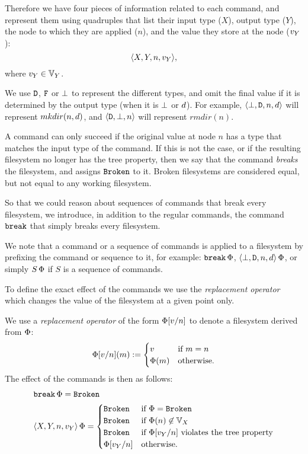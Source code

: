 \begin{mydef}
Therefore we have four pieces of information related to each command,
and represent them using quadruples that list
their input type ($X$), output type ($Y$),
the node to which they are applied ($n$),
and the value they store at the node ($v_Y$):
\[ \langle{X,Y,n,v_Y}\rangle, \]
where $v_Y\in\mathbb{V}_{Y}$.

We use $\mathtt{D}$, $\mathtt{F}$ or $\bot$ to represent the different
types, and omit the final value if it is determined by the output type
(when it is $\bot$ or $d$).
For example, $\langle{\bot,\mathtt{D},n,d}\rangle$ will represent $mkdir(n,d)$,
and $\langle{\mathtt{D},\bot,n}\rangle$ will represent $rmdir(n)$.
\end{mydef}

\bigskip

\noindent
A command can only succeed if the original value at node $n$ has a type that matches
the input type of the command. If this is not the case, or if the resulting
filesystem no longer has the tree property, then we say that the command
{\em breaks} the filesystem, and assigns $\mathtt{Broken}$ to it.
Broken filesystems are considered equal, but not equal to any working filesystem.

So that we could reason about sequences of commands that break every filesystem, 
we introduce, in addition to the regular commands,
the command $\mathtt{break}$ that simply breaks every filesystem.

We note that a command or a sequence of commands is applied to a filesystem
by prefixing the command or sequence to it, for example: $\mathtt{break}\,\Phi$, $\langle{\bot,\mathtt{D},n,d}\rangle\,\Phi$, 
or simply $S\,\Phi$ if $S$ is a sequence of commands.

To define the exact effect of the commands we use
the \emph{replacement operator}  which changes the
value of the filesystem at a given point only.

\begin{mydef}
We use a \emph{replacement operator} of the form
$\Phi[v/n]$ to denote a filesystem derived from $\Phi$:
\[ \Phi[v/n](m) :=
   \begin{cases}
   v &\mbox{if~} m=n\\
   \Phi(m) &\mbox{otherwise.}
   \end{cases}
\]
The effect of the commands is then as follows:
\begin{align*}
&\mathtt{break}\,\Phi = \mathtt{Broken} \\
&\langle{X,Y,n,v_Y}\rangle\,\Phi = 
   \begin{cases}
   \mathtt{Broken} &\mbox{if~} \Phi=\mathtt{Broken}\\
   \mathtt{Broken} &\mbox{if~} \Phi(n)\not\in\mathbb{V}_{X}\\
   \mathtt{Broken} &\mbox{if~} \Phi[v_Y/n] \mbox{~violates the tree property}\\
   \Phi[v_Y/n] &\mbox{otherwise.}
   \end{cases}
\end{align*}
\end{mydef}

